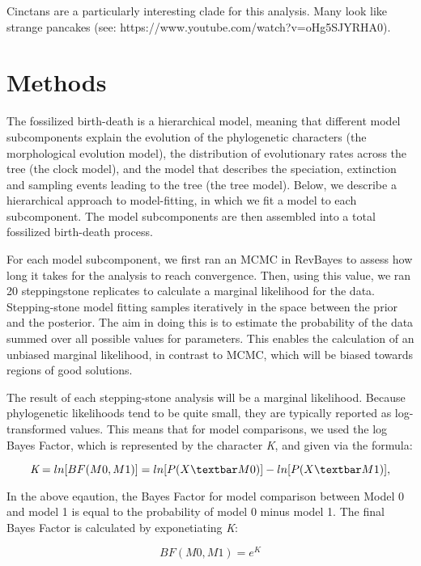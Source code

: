 \documentclass{article}
\begin{document}
Cinctans are a particularly interesting clade for this analysis.
Many look like strange pancakes (see: https://www.youtube.com/watch?v=oHg5SJYRHA0).


\section{Methods}

The fossilized birth-death is a hierarchical model, meaning that different model subcomponents explain the evolution of the phylogenetic characters (the morphological evolution model), the distribution of evolutionary rates across the tree (the clock model), and the model that describes the speciation, extinction and sampling events leading to the tree (the tree model). 
Below, we describe a hierarchical approach to model-fitting, in which we fit a model to each subcomponent.
The model subcomponents are then assembled into a total fossilized birth-death process.

For each model subcomponent, we first ran an MCMC in RevBayes to assess how long it takes for the analysis to reach convergence. 
Then, using this value, we ran 20 steppingstone replicates to calculate a marginal likelihood for the data.
Stepping-stone model fitting samples iteratively in the space between the prior and the posterior.
The aim in doing this is to estimate the probability of the data summed over all possible values for parameters. 
This enables the calculation of an unbiased marginal likelihood, in contrast to MCMC, which will be biased towards regions of good solutions. 

The result of each stepping-stone analysis will be a marginal likelihood.
Because phylogenetic likelihoods tend to be quite small, they are typically reported as log-transformed values.
This means that for model comparisons, we used the log Bayes Factor, which is represented by the character \textit{K}, and given via the formula:

\begin{center}
  \[  \textit{K}=ln[BF(M0,M1)]=ln[P(X \textbar M0)] - ln[P(X \textbar M1)],  \]
\end{center}    
    
In the above eqaution, the Bayes Factor for model comparison between Model 0 and model 1 is equal to the probability of model 0 minus model 1. The final Bayes Factor is calculated by exponetiating \textit{K}:

\begin{center}
  \[  BF(M0,M1)=\textit{e}^\textit{K} \]
\end{center}
\end{document}
